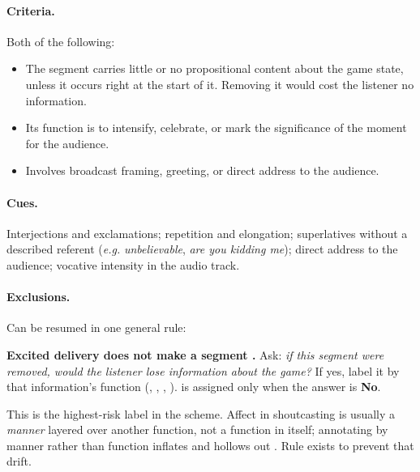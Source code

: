 \paragraph{Criteria.} Both of the following:
\begin{itemize}
  \item The segment carries little or no propositional content about the game state, unless it occurs right at the start of it. Removing it would cost the listener no information.
  \item Its function is to intensify, celebrate, or mark the significance of the moment for the audience.
  \item Involves broadcast framing, greeting, or direct address to the audience.
\end{itemize}

\paragraph{Cues.} Interjections and exclamations; repetition and elongation; superlatives without a described referent (\textit{e.g.} \emph{unbelievable}, \emph{are you kidding me}); direct address to the audience; vocative intensity in the audio track. 

\paragraph{Exclusions.} Can be resumed in one general rule:
\begin{agrulebox}
 \textbf{Excited delivery does not make a segment
\HYP{}.} Ask: \emph{if this segment were removed, would the listener lose
information about the game?} If yes, label it by that information's
function (\PBP{}, \SA{}, \REC{}, \STO{}). \HYP{} is assigned only when
the answer is \textbf{No}.
\end{agrulebox}

\noindent This is the highest-risk label in the scheme. Affect in
shoutcasting is usually a \emph{manner} layered over another function,
not a function in itself; annotating by manner rather than function
inflates \HYP{} and hollows out \PBP{}. Rule  exists to
prevent that drift.

\begin{agexample}
\\[2pt]
\\[2pt]
\end{agexample}

